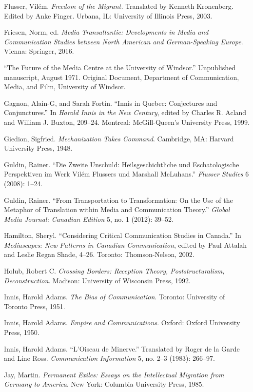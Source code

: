 \documentclass{tufte-handout}
\begin{document}
\begin{hangparas}{.25in}{1}
Flusser, Vilém. \emph{Freedom of the Migrant.} Translated by Kenneth
Kronenberg. Edited by Anke Finger. Urbana, IL: University of Illinois
Press, 2003.

Friesen, Norm, ed. \emph{Media Transatlantic: Developments in Media and
Communication Studies between North American and German-Speaking
Europe}. Vienna: Springer, 2016.

``The Future of the Media Centre at the University of Windsor.''
Unpublished manuscript, August 1971. Original Document, Department of
Communication, Media, and Film, University of Windsor.

Gagnon, Alain-G, and Sarah Fortin. ``Innis in Quebec: Conjectures and
Conjunctures.'' In \emph{Harold Innis in the New Century}, edited by
Charles R. Acland and William J. Buxton, 209--24. Montreal:
McGill-Queen's University Press, 1999.

Giedion, Sigfried. \emph{Mechanization Takes Command}. Cambridge, MA:
Harvard University Press, 1948.

Guldin, Rainer. ``Die Zweite Unschuld: Heilsgeschichtliche und
Eschatologische Perspektiven im Werk Vilém Flussers und Marshall
McLuhans.'' \emph{Flusser Studies} 6 (2008): 1--24.

Guldin, Rainer. ``From Transportation to Transformation: On the Use of
the Metaphor of Translation within Media and Communication Theory.''
\emph{Global Media Journal: Canadian Edition} 5, no. 1 (2012): 39--52.

Hamilton, Sheryl. ``Considering Critical Communication Studies in
Canada.'' In \emph{Mediascapes: New Patterns in Canadian Communication},
edited by Paul Attalah and Leslie Regan Shade, 4--26. Toronto:
Thomson-Nelson, 2002.

Holub, Robert C. \emph{Crossing Borders: Reception Theory,
Poststructuralism, Deconstruction}. Madison: University of Wisconsin
Press, 1992.

Innis, Harold Adams. \emph{The Bias of Communication}. Toronto:
University of Toronto Press, 1951.

Innis, Harold Adams. \emph{Empire and Communications}. Oxford: Oxford
University Press, 1950.

Innis, Harold Adams. ``L'Oiseau de Minerve.'' Translated by Roger de la
Garde and Line Ross. \emph{Communication Information} 5, no. 2--3
(1983): 266--97.

Jay, Martin. \emph{Permanent Exiles: Essays on the Intellectual
Migration from Germany to America}. New York: Columbia University Press,
1985.


\end{hangparas}
\end{document}
